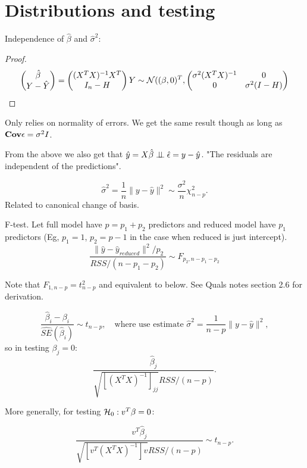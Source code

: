 \documentclass{article}
\begin{document}
\section{Distributions and testing}
\begin{fact}
    Independence of $\hat \beta$ and $\hat \sigma^2$:
    \begin{proof}
    	
	$$\begin{pmatrix}
		\hat \beta \\
		Y - \hat Y 
	\end{pmatrix} = \begin{pmatrix}
		(X^TX)^{-1} X^T \\
		I_n - H
	\end{pmatrix}Y \sim \mathcal N ((\beta,0)^T, \begin{pmatrix}
		\sigma^2 (X^TX)^{-1} & 0 \\
		0 & \sigma^2 (I - H)
	\end{pmatrix}$$
	    \end{proof}
	    Only relies on normality of errors. We get the same result though as long as $\mathbf{Cov} \epsilon = \sigma^2 I$. 
\end{fact}
From the above we also get that $\hat y = X\hat \beta \perp \! \! \! \perp \hat \epsilon = y - \hat y $. "The residuals are independent of the predictions".


\begin{fact}
$$\hat \sigma^2 = \frac{1}{n} \|y - \hat y\|^2 \sim \frac{\sigma^2}{n} \chi^2_{n-p}.$$
Related to canonical change of basis. 
\end{fact}
\begin{fact}[F-Test]
F-test. Let full model have $p = p_1 + p_2$ predictors and reduced model have $p_1$ predictors (Eg, $p_1 = 1$, $p_2 = p-1$ in the case when reduced is just intercept).
$$\frac{\|\hat y - \hat y_{reduced} \|^2/p_2}{RSS/(n-p_1 - p_2)}\sim F_{p_2, n-p_1 - p_2}$$

Note that $F_{1,n-p} = t^2_{n-p}$ and equivalent to below. See Quals notes section 2.6 for derivation. 
\end{fact}
\begin{fact}[T-test]
$$\frac{\hat \beta_i - \beta_i}{\widehat{SE} (\hat \beta_i)} \sim t_{n-p}, \quad \text{where use estimate }  \hat \sigma^2 = \frac{1}{n-p} \|y-\hat y\|^2,$$
so in testing $\beta_j = 0$:
$$\frac{\hat \beta_j }{\sqrt{ [(X^TX)^{-1} ]_{jj}}RSS/(n-p)}.$$

More generally, for testing $\mathcal H_0: v^T \beta = 0$:

$$\frac{v^T \hat \beta_j }{\sqrt{ [v^T (X^TX)^{-1} ]v}RSS/(n-p)}\sim t_{n-p}.$$
\end{fact}
\end{document}
